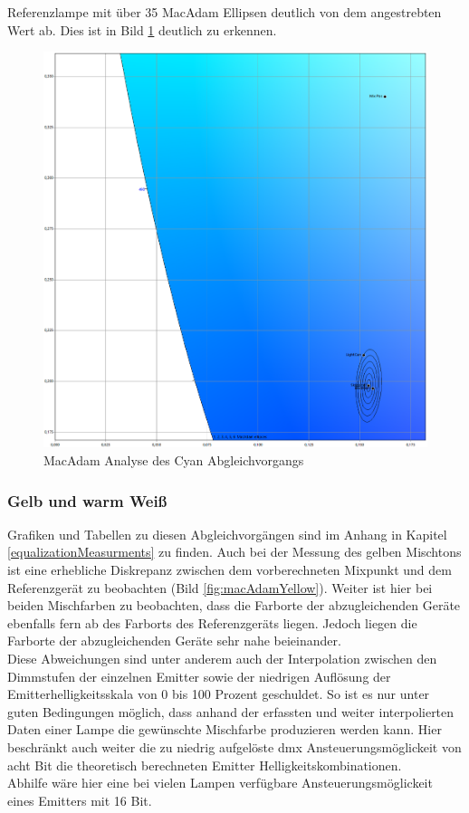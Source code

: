 \documentclass[11pt]{scrartcl}
\begin{document}
Referenzlampe mit über 35 MacAdam Ellipsen deutlich von dem angestrebten Wert ab. Dies ist in Bild \ref{fig:macAdamCyan}
deutlich zu erkennen.
\begin{figure}[H]
    \begin{center}
        \includegraphics[width=.9\textwidth]{images/macAdam/comparedCyan_mix.png}
    \end{center}
    \caption{MacAdam Analyse des Cyan Abgleichvorgangs} \label{fig:macAdamCyan}
\end{figure}
\subsubsection{Gelb und warm Weiß}
Grafiken und Tabellen zu diesen Abgleichvorgängen sind im Anhang in Kapitel \ref{equalizationMeasurments} zu finden. Auch bei
der Messung des gelben Mischtons ist eine erhebliche Diskrepanz zwischen dem vorberechneten Mixpunkt und dem Referenzgerät zu
beobachten (Bild \ref{fig:macAdamYellow}). Weiter ist hier bei beiden Mischfarben zu beobachten, dass die Farborte der
abzugleichenden Geräte ebenfalls fern ab des Farborts des Referenzgeräts liegen. Jedoch liegen die Farborte der abzugleichenden
Geräte sehr nahe beieinander.\\
Diese Abweichungen sind unter anderem auch der Interpolation zwischen den Dimmstufen der einzelnen Emitter sowie der niedrigen
Auflösung der Emitterhelligkeitsskala von 0 bis 100 Prozent geschuldet. So ist es nur unter guten Bedingungen möglich, dass
anhand der erfassten und weiter interpolierten Daten einer Lampe die gewünschte Mischfarbe produzieren werden kann. Hier
beschränkt auch weiter die zu niedrig aufgelöste \ac{dmx} Ansteuerungsmöglickeit von acht Bit die theoretisch berechneten
Emitter Helligkeitskombinationen.\\
Abhilfe wäre hier eine bei vielen Lampen verfügbare Ansteuerungsmöglickeit eines Emitters mit 16 Bit.
\end{document}
